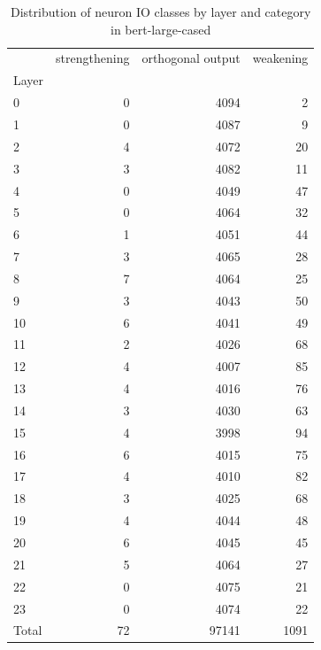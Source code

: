 \begin{table}
\caption{Distribution of neuron IO classes by layer and category in bert-large-cased}
\label{tab:bert-large-cased}
\begin{tabular}{lrrr}
 & strengthening & orthogonal output & weakening \\
Layer &  &  &  \\
0 & 0 & 4094 & 2 \\
1 & 0 & 4087 & 9 \\
2 & 4 & 4072 & 20 \\
3 & 3 & 4082 & 11 \\
4 & 0 & 4049 & 47 \\
5 & 0 & 4064 & 32 \\
6 & 1 & 4051 & 44 \\
7 & 3 & 4065 & 28 \\
8 & 7 & 4064 & 25 \\
9 & 3 & 4043 & 50 \\
10 & 6 & 4041 & 49 \\
11 & 2 & 4026 & 68 \\
12 & 4 & 4007 & 85 \\
13 & 4 & 4016 & 76 \\
14 & 3 & 4030 & 63 \\
15 & 4 & 3998 & 94 \\
16 & 6 & 4015 & 75 \\
17 & 4 & 4010 & 82 \\
18 & 3 & 4025 & 68 \\
19 & 4 & 4044 & 48 \\
20 & 6 & 4045 & 45 \\
21 & 5 & 4064 & 27 \\
22 & 0 & 4075 & 21 \\
23 & 0 & 4074 & 22 \\
Total & 72 & 97141 & 1091 \\
\end{tabular}
\end{table}
